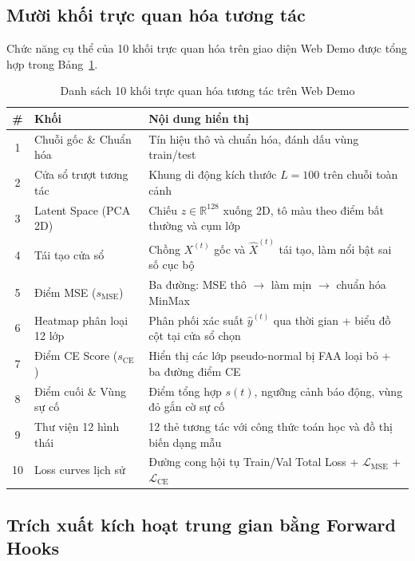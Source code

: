 \documentclass[sigconf,nonacm]{acmart}
\begin{document}
\subsection{Mười khối trực quan hóa tương tác}

Chức năng cụ thể của 10 khối trực quan hóa trên giao diện Web Demo được tổng hợp trong Bảng~\ref{tab:web_blocks}.

\begin{table}[htbp]
\centering
\caption{Danh sách 10 khối trực quan hóa tương tác trên Web Demo}
\label{tab:web_blocks}
\footnotesize
\begin{tabularx}{\columnwidth}{clX}
\toprule
\textbf{\#} & \textbf{Khối} & \textbf{Nội dung hiển thị} \\
\midrule
1 & Chuỗi gốc \& Chuẩn hóa & Tín hiệu thô và chuẩn hóa, đánh dấu vùng train/test \\
2 & Cửa sổ trượt tương tác & Khung di động kích thước $L=100$ trên chuỗi toàn cảnh \\
3 & Latent Space (PCA 2D) & Chiếu $z \in \mathbb{R}^{128}$ xuống 2D, tô màu theo điểm bất thường và cụm lớp \\
4 & Tái tạo cửa sổ & Chồng $X^{(t)}$ gốc và $\hat{X}^{(t)}$ tái tạo, làm nổi bật sai số cục bộ \\
5 & Điểm MSE ($s_{\text{MSE}}$) & Ba đường: MSE thô $\rightarrow$ làm mịn $\rightarrow$ chuẩn hóa MinMax \\
6 & Heatmap phân loại 12 lớp & Phân phối xác suất $\hat{y}^{(t)}$ qua thời gian + biểu đồ cột tại cửa sổ chọn \\
7 & Điểm CE Score ($s_{\text{CE}}$) & Hiển thị các lớp pseudo-normal bị FAA loại bỏ + ba đường điểm CE \\
8 & Điểm cuối \& Vùng sự cố & Điểm tổng hợp $s(t)$, ngưỡng cảnh báo động, vùng đỏ gắn cờ sự cố \\
9 & Thư viện 12 hình thái & 12 thẻ tương tác với công thức toán học và đồ thị biến dạng mẫu \\
10 & Loss curves lịch sử & Đường cong hội tụ Train/Val Total Loss + $\mathcal{L}_{\text{MSE}}$ + $\mathcal{L}_{\text{CE}}$ \\
\bottomrule
\end{tabularx}
\end{table}

\subsection{Trích xuất kích hoạt trung gian bằng Forward Hooks}
\end{document}
